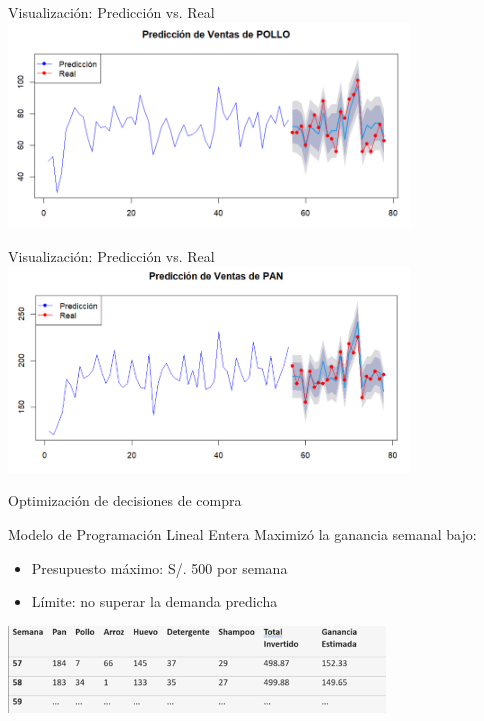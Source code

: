 \documentclass{beamer}
\begin{document}
\begin{frame}{Visualizaci\'on: Predicci\'on vs. Real}
\includegraphics[width=0.8\textwidth]{i5.png}
\end{frame}
\begin{frame}{Visualizaci\'on: Predicci\'on vs. Real}
\includegraphics[width=0.8\textwidth]{i6.png}
\end{frame}
\begin{frame}{Optimizaci\'on de decisiones de compra}
\begin{block}{Modelo de Programaci\'on Lineal Entera}
Maximiz\'o la ganancia semanal bajo:
\end{block}
\begin{itemize}
    \item Presupuesto m\'aximo: S/. 500 por semana
    \item L\'imite: no superar la demanda predicha
\end{itemize}
\vspace{0.3cm}
\includegraphics[width=0.75\textwidth]{tablaPRED.png}
\end{frame}
\end{document}
